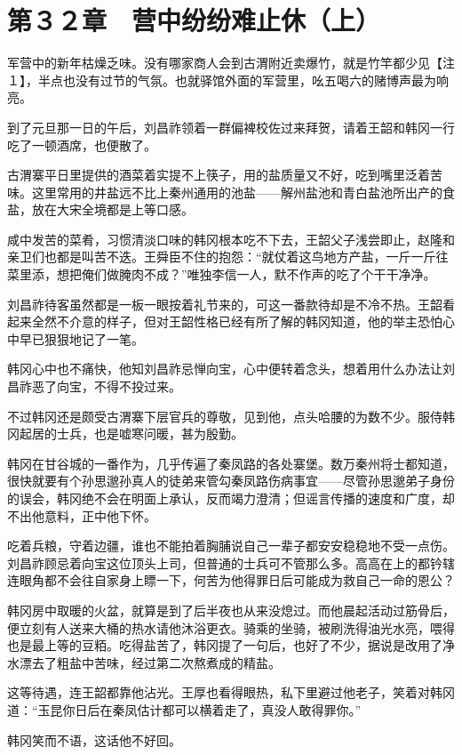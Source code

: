 \section{第３２章　营中纷纷难止休（上）}

军营中的新年枯燥乏味。没有哪家商人会到古渭附近卖爆竹，就是竹竿都少见【注１】，半点也没有过节的气氛。也就驿馆外面的军营里，吆五喝六的赌博声最为响亮。

到了元旦那一日的午后，刘昌祚领着一群偏裨校佐过来拜贺，请着王韶和韩冈一行吃了一顿酒席，也便散了。

古渭寨平日里提供的酒菜着实提不上筷子，用的盐质量又不好，吃到嘴里泛着苦味。这里常用的井盐远不比上秦州通用的池盐——解州盐池和青白盐池所出产的食盐，放在大宋全境都是上等口感。

咸中发苦的菜肴，习惯清淡口味的韩冈根本吃不下去，王韶父子浅尝即止，赵隆和亲卫们也都是叫苦不迭。王舜臣不住的抱怨：“就仗着这鸟地方产盐，一斤一斤往菜里添，想把俺们做腌肉不成？”唯独李信一人，默不作声的吃了个干干净净。

刘昌祚待客虽然都是一板一眼按着礼节来的，可这一番款待却是不冷不热。王韶看起来全然不介意的样子，但对王韶性格已经有所了解的韩冈知道，他的举主恐怕心中早已狠狠地记了一笔。

韩冈心中也不痛快，他知刘昌祚忌惮向宝，心中便转着念头，想着用什么办法让刘昌祚恶了向宝，不得不投过来。

不过韩冈还是颇受古渭寨下层官兵的尊敬，见到他，点头哈腰的为数不少。服侍韩冈起居的士兵，也是嘘寒问暖，甚为殷勤。

韩冈在甘谷城的一番作为，几乎传遍了秦凤路的各处寨堡。数万秦州将士都知道，很快就要有个孙思邈孙真人的徒弟来管勾秦凤路伤病事宜——尽管孙思邈弟子身份的误会，韩冈绝不会在明面上承认，反而竭力澄清；但谣言传播的速度和广度，却不出他意料，正中他下怀。

吃着兵粮，守着边疆，谁也不能拍着胸脯说自己一辈子都安安稳稳地不受一点伤。刘昌祚顾忌着向宝这位顶头上司，但普通的士兵可不管那么多。高高在上的都钤辖连眼角都不会往自家身上瞟一下，何苦为他得罪日后可能成为救自己一命的恩公？

韩冈房中取暖的火盆，就算是到了后半夜也从来没熄过。而他晨起活动过筋骨后，便立刻有人送来大桶的热水请他沐浴更衣。骑乘的坐骑，被刷洗得油光水亮，喂得也是最上等的豆粨。吃得盐苦了，韩冈提了一句后，也好了不少，据说是改用了净水漂去了粗盐中苦味，经过第二次熬煮成的精盐。

这等待遇，连王韶都靠他沾光。王厚也看得眼热，私下里避过他老子，笑着对韩冈道：“玉昆你日后在秦凤估计都可以横着走了，真没人敢得罪你。”

韩冈笑而不语，这话他不好回。

